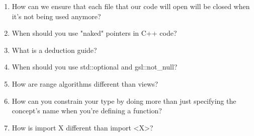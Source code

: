 \begin{enumerate}
\item
How can we ensure that each file that our code will open will be closed when it's
not being used anymore?
\item When should you use "naked" pointers in C++ code?
\item What is a deduction guide?
\item When should you use std::optional and gsl::not\_null?
\item How are range algorithms different than views?
\item How can you constrain your type by doing more than just specifying the concept's name when you're defining a function?
\item How is import X different than import <X>?
\end{enumerate}